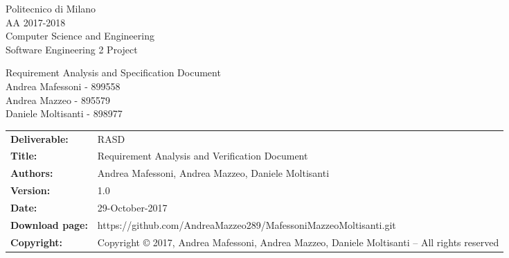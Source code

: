 
\usepackage{graphicx}
\usepackage{listings}
\renewcommand\textfraction{.1}
\usepackage{booktabs}

	
	
	\begin{titlepage}
		
		\begin{figure}[t]
			\centering
		\end{figure}
		\begin{center}
			Politecnico di Milano\\AA 2017-2018\\
			\vspace{7mm}
			Computer Science and Engineering\\
			\huge Software Engineering 2 Project
		\end{center}
	
		\begin{figure}[!h]
		\centering
		\end{figure}
		
		\begin{center}
			\fontsize{7mm}{10mm}\selectfont Requirement Analysis and Specification Document \\
			\vspace{7mm}
			\small Andrea Mafessoni - 899558\\
			Andrea Mazzeo - 895579\\
			Daniele Moltisanti - 898977
		\end{center}
	
	\end{titlepage}
	
	\begin{table}[h!]
		\begin{tabu} to \textwidth { X[0.3,r,p] X[0.7,l,p] }
			\hline
			
			\textbf{Deliverable:} & RASD\\
			\textbf{Title:} & Requirement Analysis and Verification Document \\
			\textbf{Authors:} & Andrea Mafessoni, Andrea Mazzeo, Daniele Moltisanti \\
			\textbf{Version:} & 1.0 \\ 
			\textbf{Date:} & 29-October-2017 \\
			\textbf{Download page:} & https://github.com/AndreaMazzeo289/MafessoniMazzeoMoltisanti.git \\
			\textbf{Copyright:} & Copyright © 2017, Andrea Mafessoni, Andrea Mazzeo, Daniele Moltisanti – All rights reserved \\
			\hline
		\end{tabu}
	\end{table}
	
